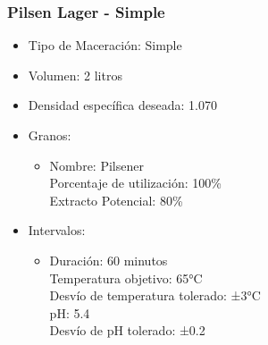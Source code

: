             \subsubsection{Pilsen Lager - Simple} 
                \begin{itemize}
                    \item Tipo de Maceración: Simple
                    \item Volumen: 2 litros
                    \item Densidad específica deseada: 1.070
                    \item Granos:
                        \begin{itemize}
                            \item Nombre: Pilsener \\
                                Porcentaje de utilización: 100\% \\
                                Extracto Potencial: 80\%
                        \end{itemize}
                    \item Intervalos:
                        \begin{itemize}
                            \item Duración: 60 minutos \\
                             Temperatura objetivo: 65°C \\
                             Desvío de temperatura tolerado: ±3°C \\
                             pH: 5.4 \\
                             Desvío de pH tolerado: ±0.2 \\
                        \end{itemize}
                \end{itemize}
                
